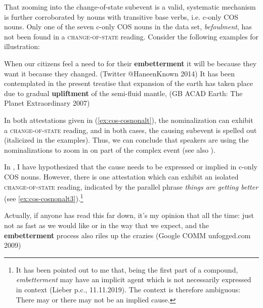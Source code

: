 That zooming into the change-of-state subevent is a valid, systematic mechanism is further corroborated by nouns with transitive base verbs, i.e. c-only COS nouns. 
Only one of the seven c-only COS nouns in the data set, \textit{befoulment}, has not been found in a \textsc{change-of-state} reading. Consider the following examples for illustration:

\begin{exe}
  \ex \label{ex:cos-cosnonalt} 
  \begin{xlist}
    \ex \label{ex:cos-cosnonalt1} When our citizens feel a need to  for their \textbf{embetterment}  \textendash{}  it will be because they want it because they changed. {\small(Twitter @HaneenKnown 2014)}
    \ex \label{ex:cos-cosnonalt2} It has been contemplated in the present treatise that expansion of the earth has taken place due to gradual \textbf{upliftment} of the semi-fluid mantle,   
    {\small(\acs{GB} ACAD Earth: The Planet Extraordinary 2007)}
  \end{xlist}
\end{exe} 

\noindent In both attestations given in (\ref{ex:cos-cosnonalt}), the nominalization can exhibit a \textsc{change-of-state} reading, and in both cases, the causing subevent is spelled out (italicized in the examples). 
Thus, we can conclude that speakers are using the nominalizations to zoom in on part of the complex event (see also ). 

In , I have hypothesized that the cause needs to be expressed or implied in c-only COS nouns. However, there is one attestation which can exhibit an isolated \textsc{change-of-state} reading, indicated by the parallel phrase \textit{things are getting better} (see \ref{ex:cos-cosnonalt3}).\footnote{It has been pointed out to me that, being the first part of a compound, \textit{embetterment} may have an implicit agent which is not necessarily expressed in context (Lieber p.c., 11.11.2019). The context is therefore ambiguous: There may or there may not be an implied cause.}

\begin{exe}
  \ex \label{ex:cos-cosnonalt3} Actually, if anyone has read this far down, it's my opinion that  all the time: just not as fast as we would like or in the way that we expect, and the \textbf{embetterment} process also riles up the crazies {\small(Google COMM unfogged.com 2009)}
\end{exe} 

